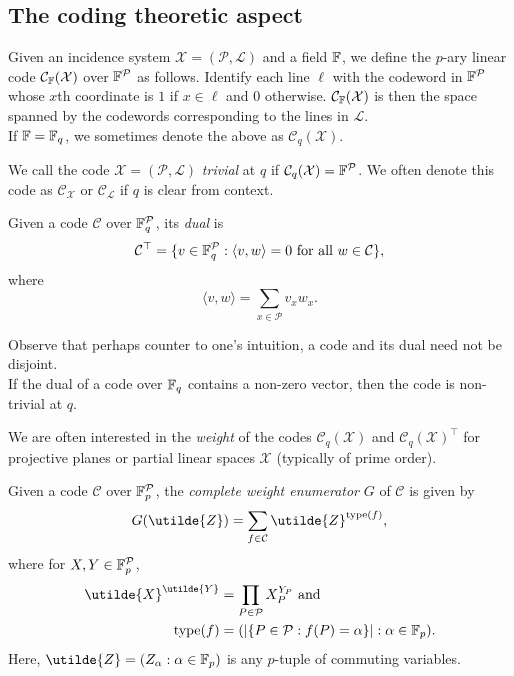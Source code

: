 \subsection{The coding theoretic aspect}

	\begin{fdef}
		Given an incidence system $\mathcal{X} = (\mathcal{P},\mathcal{L})$ and a field $\mathbb{F}$, we define the $p$-ary linear code $\mathcal{C}_{\mathbb{F}}(\mathcal{X})$ over $\mathbb{F}^\mathcal{P}$ as follows. Identify each line $\ell$ with the codeword in $\mathbb{F}^{\mathcal{P}}$ whose $x$th coordinate is $1$ if $x \in \ell$ and $0$ otherwise. $\mathcal{C}_{\mathbb{F}}(\mathcal{X})$ is then the space spanned by the codewords corresponding to the lines in $\mathcal{L}$.\\
		If $\mathbb{F} = \mathbb{F}_q$, we sometimes denote the above as $\mathcal{C}_q(\mathcal{X})$.
	\end{fdef}

	We call the code $\mathcal{X} = (\mathcal{P},\mathcal{L})$ \emph{trivial} at $q$ if $\mathcal{C}_q(\mathcal{X}) = \mathbb{F}^\mathcal{P}$. We often denote this code as $\mathcal{C}_\mathcal{X}$ or $\mathcal{C}_\mathcal{L}$ if $q$ is clear from context.

	\begin{fdef}[Dual]
		Given a code $\mathcal{C}$ over $\mathbb{F}_q^\mathcal{P}$, its \emph{dual} is
		\[ \mathcal{C}^\top = \{ v \in \mathbb{F}_q^\mathcal{P} : \langle v,w\rangle = 0 \text{ for all }w\in\mathcal{C} \}, \]
		where
		\[ \langle v , w \rangle = \sum_{x \in \mathcal{P}} v_x w_x.  \]
	\end{fdef}
	Observe that perhaps counter to one's intuition, a code and its dual need not be disjoint.\\
	If the dual of a code over $\mathbb{F}_q$ contains a non-zero vector, then the code is non-trivial at $q$.

	We are often interested in the \emph{weight} of the codes $\mathcal{C}_q(\mathcal{X})$ and $\mathcal{C}_q(\mathcal{X})^\top$ for projective planes or partial linear spaces $\mathcal{X}$ (typically of prime order).

	\begin{fdef}
		Given a code $\mathcal{C}$ over $\mathbb{F}_p^{\mathcal{P}}$, the \emph{complete weight enumerator} $G$ of $\mathcal{C}$ is given by
		\[ G(\utilde{Z}) = \sum_{f \in \mathcal{C}} \utilde{Z}^{\type(f)}, \]
		where for $X,Y \in \mathbb{F}_p^{\mathcal{P}}$,
		\begin{align*}
			\utilde{X}^{\utilde{Y}} &= \prod_{P \in \mathcal{P}} X_P^{Y_P} \text{ and } \\
			\type(f) &= ( |\{ P \in \mathcal{P} : f(P) = \alpha \}|  : \alpha \in \F_p ).
		\end{align*}
		Here, $\utilde{Z} = ( Z_\alpha : \alpha \in \F_p )$ is any $p$-tuple of commuting variables.
	\end{fdef}

